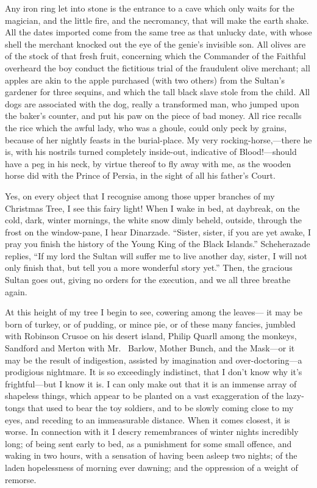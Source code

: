 Any iron ring let into stone is the entrance to a cave which only
waits for the magician, and the little fire, and the necromancy,
that will make the earth shake.  All the dates imported come from
the same tree as that unlucky date, with whose shell the merchant
knocked out the eye of the genie's invisible son.  All olives are of
the stock of that fresh fruit, concerning which the Commander of the
Faithful overheard the boy conduct the fictitious trial of the
fraudulent olive merchant; all apples are akin to the apple
purchased (with two others) from the Sultan's gardener for three
sequins, and which the tall black slave stole from the child.  All
dogs are associated with the dog, really a transformed man, who
jumped upon the baker's counter, and put his paw on the piece of bad
money.  All rice recalls the rice which the awful lady, who was a
ghoule, could only peck by grains, because of her nightly feasts in
the burial-place.  My very rocking-horse,---there he is, with his
nostrils turned completely inside-out, indicative of Blood!---should
have a peg in his neck, by virtue thereof to fly away with me, as
the wooden horse did with the Prince of Persia, in the sight of all
his father's Court.

Yes, on every object that I recognise among those upper branches of
my Christmas Tree, I see this fairy light!  When I wake in bed, at
daybreak, on the cold, dark, winter mornings, the white snow dimly
beheld, outside, through the frost on the window-pane, I hear
Dinarzade.  ``Sister, sister, if you are yet awake, I pray you finish
the history of the Young King of the Black Islands.''  Scheherazade
replies, ``If my lord the Sultan will suffer me to live another day,
sister, I will not only finish that, but tell you a more wonderful
story yet.''  Then, the gracious Sultan goes out, giving no orders
for the execution, and we all three breathe again.

At this height of my tree I begin to see, cowering among the leaves---%
it may be born of turkey, or of pudding, or mince pie, or of these
many fancies, jumbled with Robinson Crusoe on his desert island,
Philip Quarll among the monkeys, Sandford and Merton with Mr.\ %
Barlow, Mother Bunch, and the Mask---or it may be the result of
indigestion, assisted by imagination and over-doctoring---a
prodigious nightmare.  It is so exceedingly indistinct, that I don't
know why it's frightful---but I know it is.  I can only make out that
it is an immense array of shapeless things, which appear to be
planted on a vast exaggeration of the lazy-tongs that used to bear
the toy soldiers, and to be slowly coming close to my eyes, and
receding to an immeasurable distance.  When it comes closest, it is
worse.  In connection with it I descry remembrances of winter nights
incredibly long; of being sent early to bed, as a punishment for
some small offence, and waking in two hours, with a sensation of
having been asleep two nights; of the laden hopelessness of morning
ever dawning; and the oppression of a weight of remorse.

